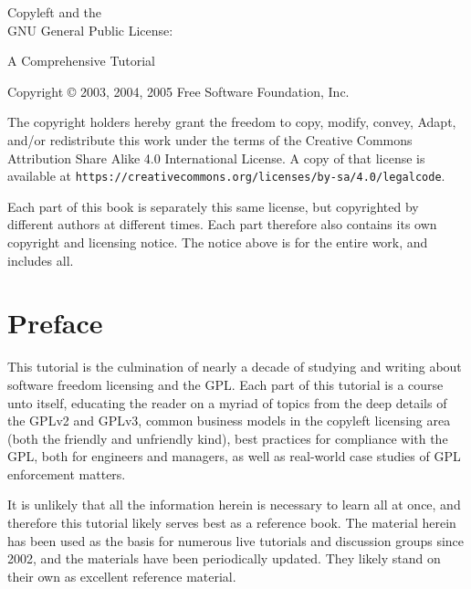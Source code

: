 \documentclass[10pt, letterpaper]{book}
\begin{document}
\pagestyle{plain}

\frontmatter

\begin{titlepage}

\begin{center}

{\Huge
{\sc Copyleft and the  \\

GNU General Public License:

\vspace{.25in}

A Comprehensive Tutorial
}}
\vfill

{\parindent 0in
Copyright \copyright{} 2003, 2004, 2005 \hspace{.2in} Free Software Foundation, Inc.

\vspace{.3in}

The copyright holders hereby grant the freedom to copy, modify, convey,
Adapt, and/or redistribute this work under the terms of the Creative Commons
Attribution Share Alike 4.0 International License.  A copy of that license is
available at \verb=https://creativecommons.org/licenses/by-sa/4.0/legalcode=.

Each part of this book is separately this same license, but copyrighted by
different authors at different times.  Each part therefore also contains its
own copyright and licensing notice.  The notice above is for the entire work,
and includes all.
}
\end{center}

\end{titlepage}

\tableofcontents

\chapter{Preface}

This tutorial is the culmination of nearly a decade of studying and writing
about software freedom licensing and the GPL\@.  Each part of this tutorial
is a course unto itself, educating the reader on a myriad of topics from the
deep details of the GPLv2 and GPLv3, common business models in the copyleft
licensing area (both the friendly and unfriendly kind), best practices for
compliance with the GPL, both for engineers and managers, as well as
real-world case studies of GPL enforcement matters.

It is unlikely that all the information herein is necessary to learn all at
once, and therefore this tutorial likely serves best as a reference book.
The material herein has been used as the basis for numerous live tutorials
and discussion groups since 2002, and the materials have been periodically
updated.   They likely stand on their own as excellent reference material.
\end{document}
